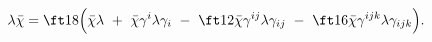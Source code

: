 \begin{equation}
\lambda \bar{\chi}=\ft18\Bigl(\bar{\chi}\lambda
                \ + \ \bar{\chi}\gamma^i\lambda\gamma_i
                \ -\ \ft12\bar{\chi}\gamma^{ij}\lambda\gamma_{ij}
                 \ -\  \ft16\bar{\chi}\gamma^{ijk}\lambda\gamma_{ijk} \Bigr).
\end{equation}

